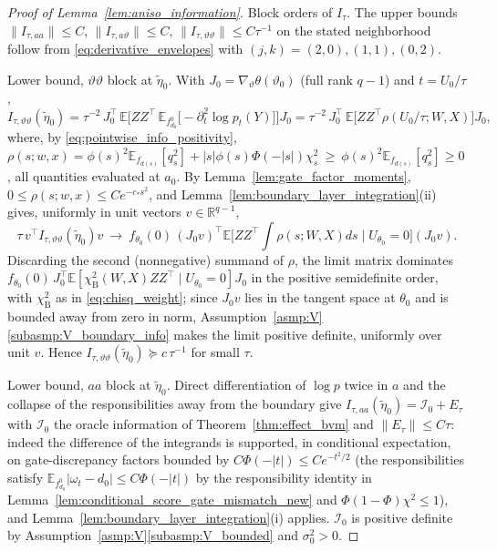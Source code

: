 \documentclass[10pt,a4paper]{amsart}
\newcommand{\E}{\mathbb{E}}
\newcommand{\R}{\mathbb{R}}
\begin{document}
\begin{proof}[Proof of Lemma~\ref{lem:aniso_information}]
Block orders of $I_\tau$. The upper bounds
$\|I_{\tau,aa}\|\le C$, $\|I_{\tau,a\vartheta}\|\le C$, $\|I_{\tau,\vartheta\vartheta}\|\le C\tau^{-1}$
on the stated neighborhood follow from \eqref{eq:derivative_envelopes} with $(j,k)=(2,0),(1,1),(0,2)$.

Lower bound, $\vartheta\vartheta$ block at $\tilde\eta_0$. With $J_0=\nabla_\vartheta\theta(\vartheta_0)$ (full rank $q-1$) and $t=U_0/\tau$,
\[
I_{\tau,\vartheta\vartheta}(\tilde\eta_0)
=\tau^{-2}\,J_0^\top\,\E\Big[ZZ^\top\,\E_{f^0_{d_0}}\big[-\partial^2_t\log p_t(Y)\big]\Big]J_0
=\tau^{-2}\,J_0^\top\,\E\big[ZZ^\top\rho(U_0/\tau;W,X)\big]J_0,
\]
where, by \eqref{eq:pointwise_info_positivity},
$\rho(s;w,x)=\phi(s)^2\E_{f_{d(s)}}[q_s^2]+|s|\phi(s)\Phi(-|s|)\chi^2_s\ \ge\ \phi(s)^2\E_{f_{d(s)}}[q_s^2]\ge0$,
all quantities evaluated at $a_0$. By Lemma~\ref{lem:gate_factor_moments}, $0\le\rho(s;w,x)\le Ce^{-c_*s^2}$, and Lemma~\ref{lem:boundary_layer_integration}(ii) gives, uniformly in unit vectors $v\in\R^{q-1}$,
\[
\tau\,v^\top I_{\tau,\vartheta\vartheta}(\tilde\eta_0)v
\ \longrightarrow\
f_{\theta_0}(0)\,(J_0v)^\top\E\Big[ZZ^\top\!\!\int\rho(s;W,X)ds\;\Big|\;U_{\theta_0}=0\Big](J_0v).
\]
Discarding the second (nonnegative) summand of $\rho$, the limit matrix dominates
$f_{\theta_0}(0)\,J_0^\top\E[\chi^2_{\mathrm B}(W,X)ZZ^\top\mid U_{\theta_0}=0]J_0$ in the positive semidefinite order, with $\chi^2_{\mathrm B}$ as in \eqref{eq:chisq_weight}; since $J_0v$ lies in the tangent space at $\theta_0$ and is bounded away from zero in norm, Assumption~\ref{asmp:V}\ref{subasmp:V_boundary_info} makes the limit positive definite, uniformly over unit $v$. Hence $I_{\tau,\vartheta\vartheta}(\tilde\eta_0)\succeq c\,\tau^{-1}$ for small $\tau$.

Lower bound, $aa$ block at $\tilde\eta_0$. Direct differentiation of $\log p$ twice in $a$ and the collapse of the responsibilities away from the boundary give
$I_{\tau,aa}(\tilde\eta_0)=\mathcal I_0+E_\tau$ with $\mathcal I_0$ the oracle information of Theorem~\ref{thm:effect_bvm} and $\|E_\tau\|\le C\tau$: indeed the difference of the integrands is supported, in conditional expectation, on gate-discrepancy factors bounded by $C\Phi(-|t|)\le Ce^{-t^2/2}$ (the responsibilities satisfy $\E_{f^0_{d_0}}|\omega_t-d_0|\le C\Phi(-|t|)$ by the responsibility identity in Lemma~\ref{lem:conditional_score_gate_mismatch_new} and $\Phi(1-\Phi)\chi^2\le1$), and Lemma~\ref{lem:boundary_layer_integration}(i) applies. $\mathcal I_0$ is positive definite by Assumption~\ref{asmp:V}\ref{subasmp:V_bounded} and $\sigma_0^2>0$.


\end{proof}
\end{document}
